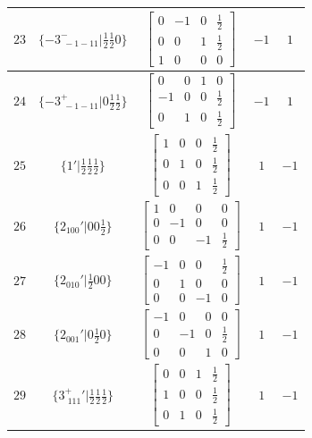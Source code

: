 \documentclass[fleqn,8pt]{jsarticle}
\begin{document}
\begin{longtable}{ccccc}
$ 23 $ & $ \{-3^{-}_{\,\,-1-11}|\frac{1}{2} \frac{1}{2} 0\} $ & $ \begin{bmatrix} 0 & -1 & 0 & \frac{1}{2} \\ 0 & 0 & 1 & \frac{1}{2} \\ 1 & 0 & 0 & 0 \end{bmatrix} $ & $ -1 $ & $ 1 $ \\ \hline
$ 24 $ & $ \{-3^{+}_{\,\,-1-11}|0 \frac{1}{2} \frac{1}{2}\} $ & $ \begin{bmatrix} 0 & 0 & 1 & 0 \\ -1 & 0 & 0 & \frac{1}{2} \\ 0 & 1 & 0 & \frac{1}{2} \end{bmatrix} $ & $ -1 $ & $ 1 $ \\ \hline
$ 25 $ & $ \{1{}'|\frac{1}{2} \frac{1}{2} \frac{1}{2}\} $ & $ \begin{bmatrix} 1 & 0 & 0 & \frac{1}{2} \\ 0 & 1 & 0 & \frac{1}{2} \\ 0 & 0 & 1 & \frac{1}{2} \end{bmatrix} $ & $ 1 $ & $ -1 $ \\ \hline
$ 26 $ & $ \{2{}_{100}{}'|0 0 \frac{1}{2}\} $ & $ \begin{bmatrix} 1 & 0 & 0 & 0 \\ 0 & -1 & 0 & 0 \\ 0 & 0 & -1 & \frac{1}{2} \end{bmatrix} $ & $ 1 $ & $ -1 $ \\ \hline
$ 27 $ & $ \{2{}_{010}{}'|\frac{1}{2} 0 0\} $ & $ \begin{bmatrix} -1 & 0 & 0 & \frac{1}{2} \\ 0 & 1 & 0 & 0 \\ 0 & 0 & -1 & 0 \end{bmatrix} $ & $ 1 $ & $ -1 $ \\ \hline
$ 28 $ & $ \{2{}_{001}{}'|0 \frac{1}{2} 0\} $ & $ \begin{bmatrix} -1 & 0 & 0 & 0 \\ 0 & -1 & 0 & \frac{1}{2} \\ 0 & 0 & 1 & 0 \end{bmatrix} $ & $ 1 $ & $ -1 $ \\ \hline
$ 29 $ & $ \{3^{+}_{\,\,111}{}'|\frac{1}{2} \frac{1}{2} \frac{1}{2}\} $ & $ \begin{bmatrix} 0 & 0 & 1 & \frac{1}{2} \\ 1 & 0 & 0 & \frac{1}{2} \\ 0 & 1 & 0 & \frac{1}{2} \end{bmatrix} $ & $ 1 $ & $ -1 $ \\ \hline

\end{longtable}
\end{document}
